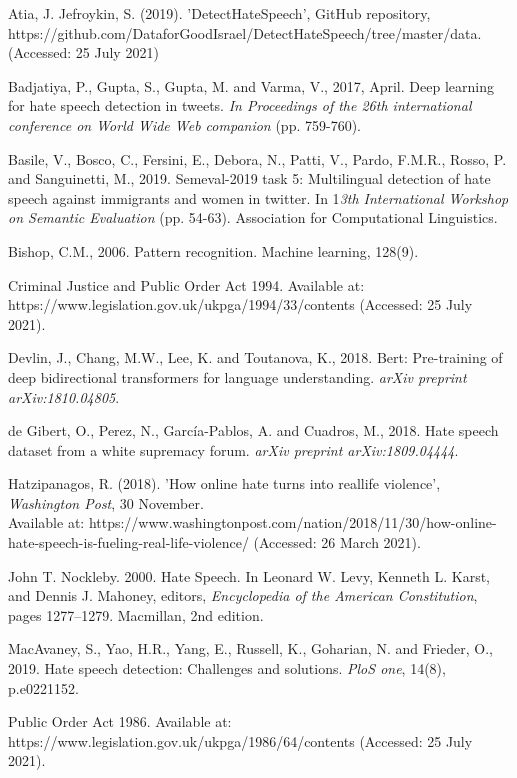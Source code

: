 \documentclass[conference]{IEEEtran}
\begin{document}
\begin{thebibliography}{00}

 Atia, J. Jefroykin, S. (2019). 'DetectHateSpeech', GitHub repository, https://github.com/DataforGoodIsrael/DetectHateSpeech/tree/master/data. (Accessed: 25 July 2021)

 Badjatiya, P., Gupta, S., Gupta, M. and Varma, V., 2017, April. Deep learning for hate speech detection in tweets. \textit{In Proceedings of the 26th international conference on World Wide Web companion} (pp. 759-760).

 Basile, V., Bosco, C., Fersini, E., Debora, N., Patti, V., Pardo, F.M.R., Rosso, P. and Sanguinetti, M., 2019. Semeval-2019 task 5: Multilingual detection of hate speech against immigrants and women in twitter. In 1\textit{3th International Workshop on Semantic Evaluation} (pp. 54-63). Association for Computational Linguistics.

 Bishop, C.M., 2006. Pattern recognition. Machine learning, 128(9).

 Criminal Justice and Public Order Act 1994. Available at: https://www.legislation.gov.uk/ukpga/1994/33/contents (Accessed: 25 July 2021).

Devlin, J., Chang, M.W., Lee, K. and Toutanova, K., 2018. Bert: Pre-training of deep bidirectional transformers for language understanding. \textit{arXiv preprint arXiv:1810.04805}.

 de Gibert, O., Perez, N., García-Pablos, A. and Cuadros, M., 2018. Hate speech dataset from a white supremacy forum. \textit{arXiv preprint arXiv:1809.04444}.

 Hatzipanagos, R. (2018). 'How online hate turns into reallife violence', \textit{Washington Post}, 30 November. \\ Available at: https://www.washingtonpost.com/nation/2018/11/30/how-online-hate-speech-is-fueling-real-life-violence/ (Accessed: 26 March 2021).

 John T. Nockleby. 2000. Hate Speech. In Leonard W.
Levy, Kenneth L. Karst, and Dennis J. Mahoney,
editors, \textit{Encyclopedia of the American Constitution},
pages 1277–1279. Macmillan, 2nd edition.

 MacAvaney, S., Yao, H.R., Yang, E., Russell, K., Goharian, N. and Frieder, O., 2019. Hate speech detection: Challenges and solutions. \textit{PloS one}, 14(8), p.e0221152.

 Public Order Act 1986. Available at: https://www.legislation.gov.uk/ukpga/1986/64/contents (Accessed: 25 July 2021).


\end{thebibliography}
\end{document}
